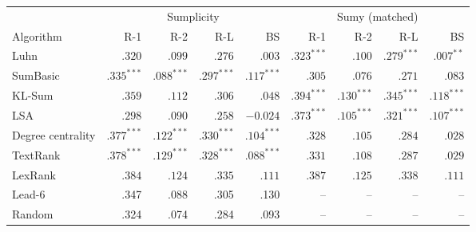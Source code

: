 \begin{tabular}{l r r r r r r r r}
\toprule
 & \multicolumn{4}{c}{Sumplicity} & \multicolumn{4}{c}{Sumy (matched)} \\
\cmidrule(lr){2-5}\cmidrule(lr){6-9}
Algorithm & R-1 & R-2 & R-L & BS & R-1 & R-2 & R-L & BS \\
\midrule
Luhn & $.320$ & $.099$ & $.276$ & $.003$ & $\mathbf{.323}^{***}$ & $.100$ & $\mathbf{.279}^{***}$ & $\mathbf{.007}^{**}$ \\
SumBasic & $\mathbf{.335}^{***}$ & $\mathbf{.088}^{***}$ & $\mathbf{.297}^{***}$ & $\mathbf{.117}^{***}$ & $.305$ & $.076$ & $.271$ & $.083$ \\
KL-Sum & $.359$ & $.112$ & $.306$ & $.048$ & $\mathbf{.394}^{***}$ & $\mathbf{.130}^{***}$ & $\mathbf{.345}^{***}$ & $\mathbf{.118}^{***}$ \\
LSA & $.298$ & $.090$ & $.258$ & $-0.024$ & $\mathbf{.373}^{***}$ & $\mathbf{.105}^{***}$ & $\mathbf{.321}^{***}$ & $\mathbf{.107}^{***}$ \\
Degree centrality & $\mathbf{.377}^{***}$ & $\mathbf{.122}^{***}$ & $\mathbf{.330}^{***}$ & $\mathbf{.104}^{***}$ & $.328$ & $.105$ & $.284$ & $.028$ \\
TextRank & $\mathbf{.378}^{***}$ & $\mathbf{.129}^{***}$ & $\mathbf{.328}^{***}$ & $\mathbf{.088}^{***}$ & $.331$ & $.108$ & $.287$ & $.029$ \\
LexRank & $.384$ & $.124$ & $.335$ & $.111$ & $.387$ & $.125$ & $.338$ & $.111$ \\
\midrule
Lead-6 & .347 & .088 & .305 & .130 & -- & -- & -- & -- \\
Random & .324 & .074 & .284 & .093 & -- & -- & -- & -- \\
\bottomrule
\end{tabular}

